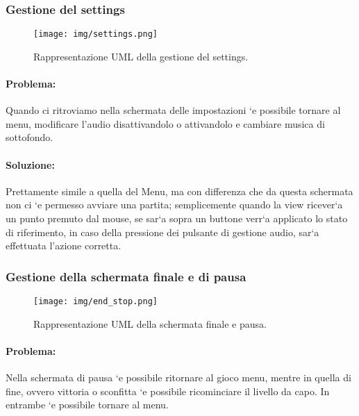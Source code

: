 \subsubsection{Gestione del settings}

\begin{figure}[H]
\centering{}
\texttt{[image: img/settings.png]}
\caption{Rappresentazione UML della gestione del settings.}
\end{figure}

\paragraph{Problema:}
Quando ci ritroviamo nella schermata delle impostazioni `e possibile tornare al menu, modificare l’audio disattivandolo o attivandolo e cambiare musica di sottofondo.

\paragraph{Soluzione:}
Prettamente simile a quella del Menu, ma con differenza che da questa schermata non ci `e permesso avviare una partita; semplicemente quando la view ricever`a un punto premuto dal mouse, se sar`a sopra un buttone verr`a applicato lo stato di riferimento, in caso della pressione dei pulsante di gestione audio, sar`a effettuata l’azione corretta.

\subsubsection{Gestione della schermata finale e di pausa}

\begin{figure}[H]
\centering{}
\texttt{[image: img/end\_stop.png]}
\caption{Rappresentazione UML della schermata finale e pausa.}
\end{figure}

\paragraph{Problema:}
Nella schermata di pausa `e possibile ritornare al gioco menu, mentre in quella di fine, ovvero vittoria o sconfitta `e possibile ricominciare il livello da capo. In entrambe `e possibile tornare al menu.

